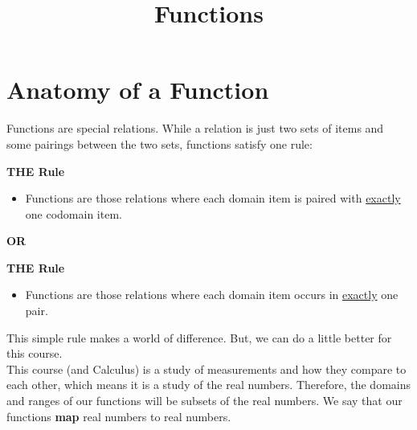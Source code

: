 \documentclass{ximera}
\title{Functions}
\begin{document}
\begin{abstract}
\end{abstract}
\maketitle





\section*{Anatomy of a Function}


Functions are special relations. While a relation is just two sets of items and some pairings between the two sets, functions satisfy one rule: \\


\begin{condition} \textbf{\textcolor{purple!85!blue}{THE Rule}}  \\

\begin{itemize}
\item Functions are those relations where each domain item is paired with \underline{exactly} one codomain item.
\end{itemize}
\end{condition}


\begin{center}
\textbf{OR}
\end{center}


\begin{condition} \textbf{\textcolor{purple!85!blue}{THE Rule}} \\

\begin{itemize}
\item Functions are those relations where each domain item occurs in \underline{exactly} one pair.
\end{itemize}
\end{condition}




This simple rule makes a world of difference. But, we can do a little better for this course. \\




This course (and Calculus) is a study of measurements and how they compare to each other, which means it is a study of the real numbers.  Therefore, the domains and ranges of our functions will be subsets of the real numbers.  We say that our functions \textbf{map} real numbers to real numbers.
\end{document}
